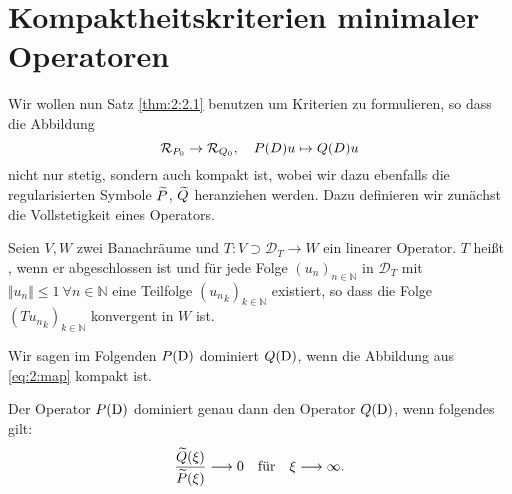 \section{Kompaktheitskriterien minimaler Operatoren}
Wir wollen nun Satz \ref{thm:2:2.1} benutzen um Kriterien zu formulieren, so dass die Abbildung
\begin{equation}\label{eq:2:map}
\mathcal R_{P_0}\to\mathcal R_{Q_0},\quad P(D)u\mapsto Q(D)u
\end{equation}
nicht nur stetig, sondern auch kompakt ist, wobei wir dazu ebenfalls die regularisierten Symbole $\widetilde{P}$, $\widetilde{Q}$ heranziehen werden. Dazu definieren wir zunächst die Vollstetigkeit eines Operators.
\begin{df}
Seien $V,W$ zwei Banachräume und $T: V \supset \mathcal{D}_T \rightarrow W$ ein linearer Operator. $T$ heißt , wenn er abgeschlossen ist und für jede Folge $(u_n)_{n \in \mathbb{N}}$ in $\mathcal{D}_T$ mit $\Vert u_n \Vert \leq 1 \ \forall n \in \mathbb{N}$ eine Teilfolge $({u_n}_k)_{k \in \mathbb{N}}$ existiert, so dass die Folge $({Tu_n}_k)_{k\in \mathbb{N}}$ konvergent in $W$ ist.
\end{df}
Wir sagen im Folgenden $P(\mathrm D)$ dominiert $Q(\mathrm D)$, wenn die Abbildung aus \eqref{eq:2:map} kompakt ist.
\begin{thm}\label{Abbildung kompakt}
Der Operator $P(\mathrm D)$ dominiert genau dann den Operator $Q(\mathrm D)$,
wenn folgendes gilt:
\begin{equation}\label{eq:2:tozero}
\frac{\widetilde{Q}(\xi)}{\widetilde{P}(\xi)}\longrightarrow0 \quad\text{für}\quad\xi\longrightarrow\infty.
\end{equation}
\end{thm}
